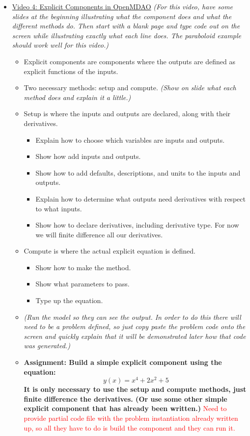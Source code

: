 \documentclass[12pt, letterpaper]{article}
\begin{document}
\begin{itemize}
	\item \underline{Video 4: Explicit Components in OpenMDAO} \textit{(For this video, have some slides at the beginning illustrating what the 				component does and what the different methods do. Then start with a blank page and type code out on the screen while illustrating exactly what each line does. The 	paraboloid example should work well for this video.)}
		\begin{itemize}
			\item Explicit components are components where the outputs are defined as explicit functions of the inputs.
			\item Two necessary methods: setup and compute. \textit{(Show on slide what each method does and explain it a little.)}
			\item Setup is where the inputs and outputs are declared, along with their derivatives.
				\begin{itemize}
					\item Explain how to choose which variables are inputs and outputs.
					\item Show how add inputs and outputs.
					\item Show how to add defaults, descriptions, and units to the inputs and outputs.
					\item Explain how to determine what outputs need derivatives with respect to what inputs.
					\item Show how to declare derivatives, including derivative type. For now we will finite difference all our derivatives.
				\end{itemize}
			\item Compute is where the actual explicit equation is defined.
				\begin{itemize}
					\item Show how to make the method.
					\item Show what parameters to pass.
					\item Type up the equation.
				\end{itemize}
			\item \textit{(Run the model so they can see the output. In order to do this there will need to be a problem defined, so just copy paste the 				problem code onto the screen and quickly explain that it will be demonstrated later how that code was generated.)}
			\item \textbf{Assignment: Build a simple explicit component using the equation: $$y(x)=x^4+2x^2+5$$ It is only necessary to use the 						setup and compute methods, just finite difference the derivatives. (Or use some other simple explicit component that has already been 						written.)} \textcolor{red}{Need to provide partial code file with the problem instantiation already written up, so all they have to do is build the component and they can run it.}
		\end{itemize}


\end{itemize}
\end{document}
